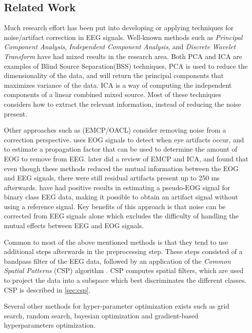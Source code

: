 \subsection{Related Work}
Much research effort has been put into developing or applying techniques for noise/artifact correction in EEG signals. Well-known methods such as \emph{Principal Component Analysis}, \emph{Independent Component Analysis}, and \emph{Discrete Wavelet Transform} have had mixed results in the research area. Both PCA and ICA are examples of Blind Source Separation(BSS) techniques, PCA is used to reduce the dimensionality of the data, and will return the principal components that maximizes variance of the data. ICA is a way of computing the independent components of a linear combined mixed source.    Most of these techniques considers how to extract the relevant information, instead of reducing the noise present.

Other approaches such as (EMCP/OACL) consider removing noise from a correction perspective. \cite{gratton1983new} uses EOG signals to detect when eye artifacts occur, and to estimate a propagation factor that can be used to determine the amount of EOG to remove from EEG. \cite{hoffmann2008correction} later did a review of EMCP and ICA, and found that even though these methods reduced the mutual information between the EOG and EEG signals, there were still residual artifacts present up to 250 ms afterwards. \cite{li2015ocular} have had positive results in estimating a pseudo-EOG signal for binary class EEG data, making it possible to obtain an artifact signal without using a reference signal. Key benefits of this approach is that noise can be corrected from EEG signals alone which excludes the difficulty of handling the mutual effects between EEG and EOG signals.

Common to most of the above mentioned methods is that they tend to use additional steps afterwards in the preprocessing step. These steps consisted of a bandpass filter of the EEG data, followed by an application of the \emph{Common Spatial Patterns} (CSP) algorithm \citep{ramoser2000optimal}. CSP computes spatial filters, which are used to project the data into a subspace which best discriminates the different classes. CSP is described in \cref{sec:csp}.

Several other methods for hyper-parameter optimization exists such as grid search, random search, bayesian optimization and gradient-based hyperparameters optimization. 

